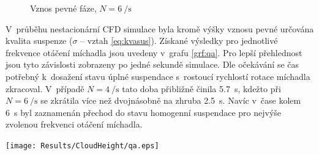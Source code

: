 \begin{figure}[h!]
 \centering
  \qquad 
  \caption{Vznos pevné fáze, $N=\SI{6}{\per\second}$}
  \label{fig:h-w10-6s}
\end{figure}
\newpage

V~průběhu nestacionární CFD simulace byla kromě výšky vznosu pevné určována kvalita suspenze ($\sigma$ -- vztah \ref{eq:kvasus}). Získané výsledky pro jednotlivé frekvence otáčení míchadla jsou uvedeny v~grafu \ref{grf:qa}. Pro lepší přehlednost jsou tyto závislosti zobrazeny po jedné sekundě simulace. Dle očekávání se čas potřebný k~dosažení stavu úplné suspendace s~rostoucí rychlostí rotace míchadla zkracoval. V~případě $N=\SI{4}{\per\second}$ tato doba přibližně činila \SI{5.7}{\second}, kdežto při $N=\SI{6}{\per\second}$ se zkrátila více než dvojnásobně na zhruba \SI{2.5}{\second}. Navíc v~čase kolem \SI{6}{\second} byl zaznamenán přechod do stavu homogenní suspendace pro nejvýše zvolenou frekvenci otáčení míchadla. 

\begin{grf}[h!]
 \centering
  \texttt{[image: Results/CloudHeight/qa.eps]}
  \caption{Průběh kvality suspenze}
  \label{grf:qa}
\end{grf}

